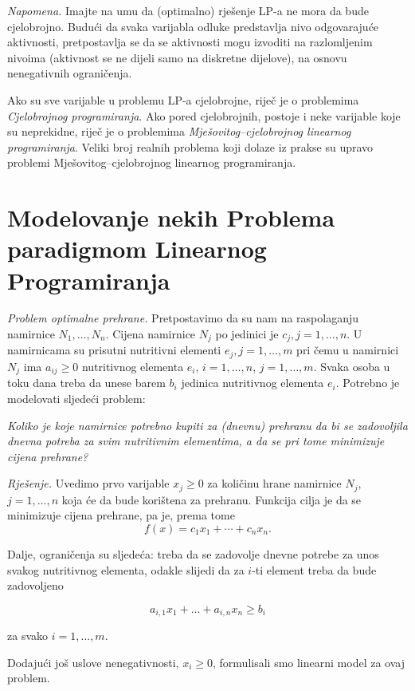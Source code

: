 \documentclass[a4paper, utf8, 11pt, colorlinks]{book}
\begin{document}
\textit{Napomena.} Imajte na umu da (optimalno) rješenje LP-a ne mora da bude cjelobrojno. Budući da svaka varijabla odluke predstavlja nivo odgovarajuće aktivnosti, pretpostavlja se da se aktivnosti mogu izvoditi na razlomljenim nivoima (aktivnost  se ne dijeli samo na diskretne dijelove), na osnovu nenegativnih ograničenja.  

Ako su sve varijable u problemu LP-a cjelobrojne, riječ je o problemima \emph{Cjelobrojnog programiranja}. Ako pored cjelobrojnih, postoje i neke varijable koje su neprekidne, riječ je o problemima \emph{Mješovitog--cjelobrojnog linearnog programiranja}. Veliki broj realnih problema koji dolaze iz prakse su upravo problemi Mješovitog--cjelobrojnog linearnog programiranja.

\section{Modelovanje nekih Problema paradigmom Linearnog Programiranja}\label{sec:modeli_lp}

\emph{Problem optimalne prehrane.} Pretpostavimo da su nam na raspolaganju namirnice $N_1, \ldots, N_n$. Cijena namirnice $N_j$ po jedinici je $c_j, j = 1, \ldots, n$. U namirnicama su prisutni nutritivni elementi $e_j,j=1,\ldots,m$ pri čemu
u namirnici $N_j$ ima $a_{ij} \geq 0$ nutritivnog elementa $e_i$, $i = 1, \ldots, n$, $j = 1, \ldots, m$. Svaka osoba u toku dana treba da unese barem $b_i$
jedinica nutritivnog elementa $e_i$. Potrebno je modelovati
sljedeći problem: 

\emph{Koliko je koje namirnice potrebno kupiti za (dnevnu) prehranu da bi se zadovoljila dnevna
potreba za svim nutritivnim elementima, a da se pri tome minimizuje cijena prehrane?}
 
 \emph{Rješenje.}  Uvedimo prvo varijable $x_j \geq 0$ za količinu hrane namirnice $N_j$, $j = 1, \ldots, n$ koja će da bude korištena za prehranu. Funkcija cilja je da se minimizuje cijena prehrane, pa je, prema tome 
 $$f(x) = c_1 x_1 + \cdots + c_n x_n.$$
 
 Dalje, ograničenja su sljedeća: treba da se zadovolje dnevne potrebe za unos svakog nutritivnog elementa, odakle slijedi da za $i$-ti element treba da bude zadovoljeno
 
 $$ a_{i,1} x_1 + \ldots + a_{i,n} x_n \geq b_i $$
 
 za svako $i=1,\ldots,m$. 
 
 Dodajući još uslove nenegativnosti, $x_i \geq 0$, formulisali smo linearni model za ovaj problem.  
 
\end{document}
